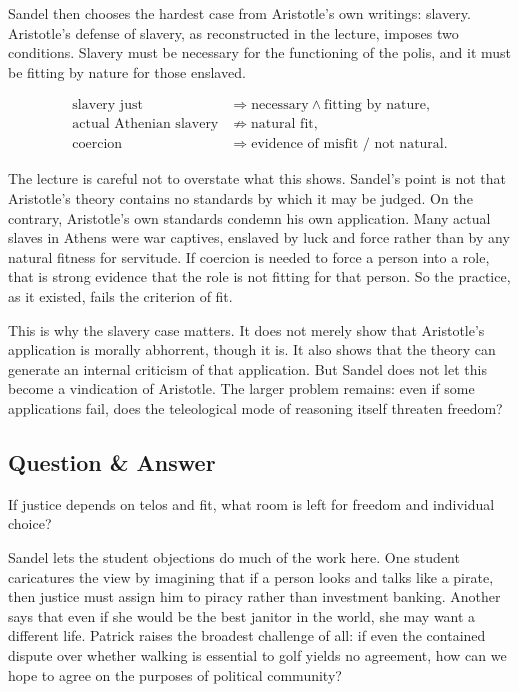 Sandel then chooses the hardest case from Aristotle's own writings: slavery. Aristotle's defense of slavery, as reconstructed in the lecture, imposes two conditions. Slavery must be necessary for the functioning of the polis, and it must be fitting by nature for those enslaved.

\begin{align}
\text{slavery just}
&\Longrightarrow
\text{necessary} \land \text{fitting by nature},\\
\text{actual Athenian slavery}
&\not\Longrightarrow
\text{natural fit},\\
\text{coercion}
&\Longrightarrow
\text{evidence of misfit / not natural}.
\end{align}

The lecture is careful not to overstate what this shows. Sandel's point is not that Aristotle's theory contains no standards by which it may be judged. On the contrary, Aristotle's own standards condemn his own application. Many actual slaves in Athens were war captives, enslaved by luck and force rather than by any natural fitness for servitude. If coercion is needed to force a person into a role, that is strong evidence that the role is not fitting for that person. So the practice, as it existed, fails the criterion of fit.

This is why the slavery case matters. It does not merely show that Aristotle's application is morally abhorrent, though it is. It also shows that the theory can generate an internal criticism of that application. But Sandel does not let this become a vindication of Aristotle. The larger problem remains: even if some applications fail, does the teleological mode of reasoning itself threaten freedom?

\subsection{Question \& Answer}

If justice depends on telos and fit, what room is left for freedom and individual choice?

Sandel lets the student objections do much of the work here. One student caricatures the view by imagining that if a person looks and talks like a pirate, then justice must assign him to piracy rather than investment banking. Another says that even if she would be the best janitor in the world, she may want a different life. Patrick raises the broadest challenge of all: if even the contained dispute over whether walking is essential to golf yields no agreement, how can we hope to agree on the purposes of political community?

